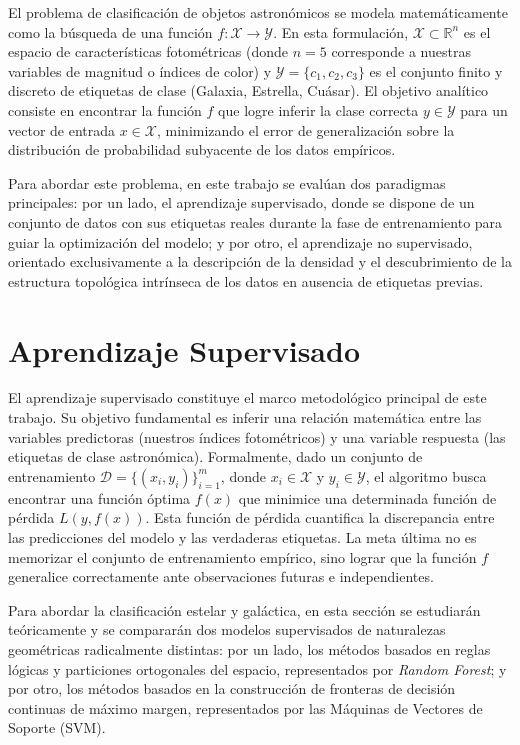 \documentclass[12pt, a4paper]{report}
\begin{document}
El problema de clasificación de objetos astronómicos se modela matemáticamente como la búsqueda de una función $f: \mathcal{X} \rightarrow \mathcal{Y}$. En esta formulación, $\mathcal{X} \subset \mathbb{R}^n$ es el espacio de características fotométricas (donde $n=5$ corresponde a nuestras variables de magnitud o índices de color) y $\mathcal{Y} = \{c_1, c_2, c_3\}$ es el conjunto finito y discreto de etiquetas de clase (Galaxia, Estrella, Cuásar). El objetivo analítico consiste en encontrar la función $f$ que logre inferir la clase correcta $y \in \mathcal{Y}$ para un vector de entrada $x \in \mathcal{X}$, minimizando el error de generalización sobre la distribución de probabilidad subyacente de los datos empíricos.

Para abordar este problema, en este trabajo se evalúan dos paradigmas principales: por un lado, el aprendizaje supervisado, donde se dispone de un conjunto de datos con sus etiquetas reales durante la fase de entrenamiento para guiar la optimización del modelo; y por otro, el aprendizaje no supervisado, orientado exclusivamente a la descripción de la densidad y el descubrimiento de la estructura topológica intrínseca de los datos en ausencia de etiquetas previas.

\section{Aprendizaje Supervisado}

El aprendizaje supervisado constituye el marco metodológico principal de este trabajo. Su objetivo fundamental es inferir una relación matemática entre las variables predictoras (nuestros índices fotométricos) y una variable respuesta (las etiquetas de clase astronómica). Formalmente, dado un conjunto de entrenamiento $\mathcal{D} = \{(x_i, y_i)\}_{i=1}^m$, donde $x_i \in \mathcal{X}$ y $y_i \in \mathcal{Y}$, el algoritmo busca encontrar una función óptima $f(x)$ que minimice una determinada función de pérdida $L(y, f(x))$. Esta función de pérdida cuantifica la discrepancia entre las predicciones del modelo y las verdaderas etiquetas. La meta última no es memorizar el conjunto de entrenamiento empírico, sino lograr que la función $f$ generalice correctamente ante observaciones futuras e independientes.

Para abordar la clasificación estelar y galáctica, en esta sección se estudiarán teóricamente y se compararán dos modelos supervisados de naturalezas geométricas radicalmente distintas: por un lado, los métodos basados en reglas lógicas y particiones ortogonales del espacio, representados por \textit{Random Forest}; y por otro, los métodos basados en la construcción de fronteras de decisión continuas de máximo margen, representados por las Máquinas de Vectores de Soporte (SVM).
\end{document}
